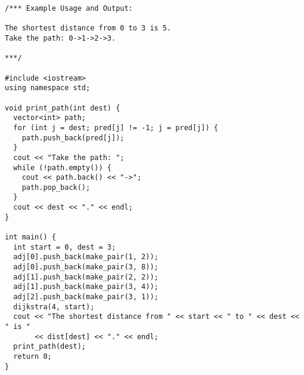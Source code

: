 \begin{lstlisting}
/*** Example Usage and Output:

The shortest distance from 0 to 3 is 5.
Take the path: 0->1->2->3.

***/

#include <iostream>
using namespace std;

void print_path(int dest) {
  vector<int> path;
  for (int j = dest; pred[j] != -1; j = pred[j]) {
    path.push_back(pred[j]);
  }
  cout << "Take the path: ";
  while (!path.empty()) {
    cout << path.back() << "->";
    path.pop_back();
  }
  cout << dest << "." << endl;
}

int main() {
  int start = 0, dest = 3;
  adj[0].push_back(make_pair(1, 2));
  adj[0].push_back(make_pair(3, 8));
  adj[1].push_back(make_pair(2, 2));
  adj[1].push_back(make_pair(3, 4));
  adj[2].push_back(make_pair(3, 1));
  dijkstra(4, start);
  cout << "The shortest distance from " << start << " to " << dest << " is "
       << dist[dest] << "." << endl;
  print_path(dest);
  return 0;
}
\end{lstlisting}
